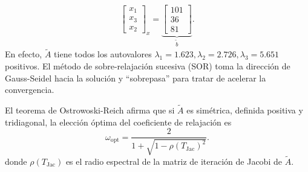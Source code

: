 \begin{frame}
\begin{solution}
\begin{enumerate}[b)]
\begin{align*}
{\begin{bmatrix}
						      x_{1} \\
						      x_{3} \\
						      x_{2}
					      \end{bmatrix}
				      }_{\displaystyle x}
				      =
				      \underbrace{
					      \begin{bmatrix}
						      101 \\
						      36  \\
						      81
					      \end{bmatrix}
				      }_{\displaystyle \widetilde{b}}.
			      \end{align*}
			      En efecto, $\widetilde{A}$ tiene todos los autovalores
			      \begin{math}
				      \lambda_{1}=1.623,
				      \lambda_{2}=2.726,
				      \lambda_{3}=5.651
			      \end{math}
			      positivos.
			      El método de sobre-relajación sucesiva (SOR) toma la
			      dirección de Gauss-Seidel hacia la solución y
			      ``sobrepasa'' para tratar de acelerar la convergencia.

			      El teorema de \alert{Ostrowoski-Reich} afirma que si
			      $\widetilde{A}$ es simétrica, definida positiva y
			      tridiagonal, la elección óptima del
			      coeficiente de relajación es
			      \begin{equation*}
				      \omega_{\text{opt}}=
				      \dfrac{2}{
				      1+
				      \sqrt{1-{\rho\left(T_{\text{Jac}}\right)}^{2}}
				      }.
			      \end{equation*}
			      donde \begin{math}
				      \rho\left(T_{\text{Jac}}\right)
			      \end{math}
			      es el radio espectral de la matriz de iteración de
			      Jacobi de $\widetilde{A}$.
		\end{enumerate}
	\end{solution}
\end{frame}

